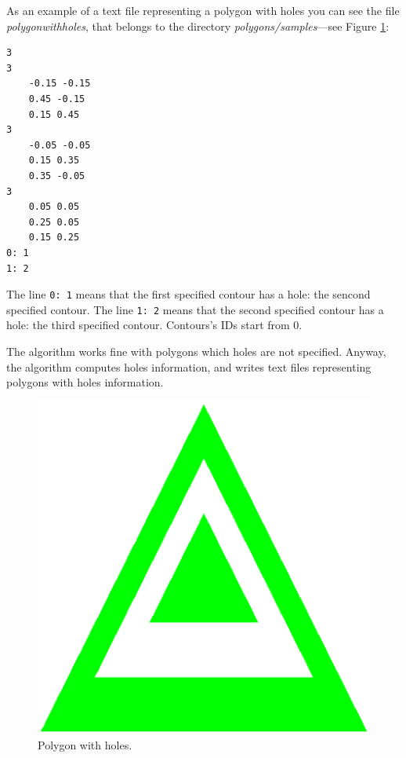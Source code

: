 \documentclass[a4paper]{article}
\begin{document}
As an example of a text file representing a polygon with holes you can see the file \textit{polygonwithholes}, that belongs to the 
directory \textit{polygons/samples}---see Figure \ref{holes}:

\begin{verbatim}
3
3
	-0.15 -0.15
	0.45 -0.15
	0.15 0.45
3
	-0.05 -0.05
	0.15 0.35
	0.35 -0.05
3
	0.05 0.05
	0.25 0.05
	0.15 0.25
0: 1
1: 2
\end{verbatim}

The line \verb+0: 1+ means that the first specified contour has a hole: the sencond specified contour. The line \verb+1: 2+ means that the 
second specified contour has a hole: the third specified contour. Contours's IDs start from 0.

The algorithm works fine with polygons which holes are not specified. Anyway, the algorithm computes holes information, and writes text files
representing polygons with holes information.

%
%
\begin{figure}
\centering
\includegraphics[scale=0.3]{holes.eps}
\caption{Polygon with holes.}
\label{holes}
\end{figure}

%
%
\end{document}
